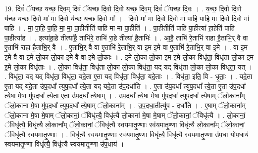 \documentclass[17pt]{extarticle}
\begin{document}
19. दिवं॑ ॅयच्छ यच्छ॒ दिव॒म् दिवं॑ ॅयच्छ दि॒वो दि॒वो य॑च्छ॒ दिव॒म् दिवं॑ ॅयच्छ दि॒वः । . य॒च्छ॒ दि॒वो दि॒वो य॑च्छ यच्छ दि॒वो मा॑ मा दि॒वो य॑च्छ यच्छ दि॒वो मा᳚ । . दि॒वो मा॑ मा दि॒वो दि॒वो मा॑ पाहि पाहि मा दि॒वो दि॒वो मा॑ पाहि । . मा॒ पा॒हि॒ पा॒हि॒ मा॒ मा॒ पा॒हीतीति॑ पाहि मा मा पा॒हीति॑ । . पा॒हीतीति॑ पाहि पा॒हीत्या॑ हा॒हेति॑ पाहि पा॒हीत्या॑ह । . इत्या॑हा॒हे तीत्या॑है॒ ताभि॑रे॒ ताभि॑ रा॒हे तीत्या॑ है॒ताभिः॑ । . आ॒है॒ ताभि॑ रे॒ताभि॑ राहा है॒ताभि॒र् वै वा ए॒ताभि॑ राहा है॒ताभि॒र् वै । . ए॒ताभि॒र् वै वा ए॒ताभि॑ रे॒ताभि॒र् वा इ॒म इ॒मे वा ए॒ताभि॑ रे॒ताभि॒र् वा इ॒मे । . वा इ॒म इ॒मे वै वा इ॒मे लो॒का लो॒का इ॒मे वै वा इ॒मे लो॒काः । . इ॒मे लो॒का लो॒का इ॒म इ॒मे लो॒का विधृ॑ता॒ विधृ॑ता लो॒का इ॒म इ॒मे लो॒का विधृ॑ताः । . लो॒का विधृ॑ता॒ विधृ॑ता लो॒का लो॒का विधृ॑ता॒ यद् यद् विधृ॑ता लो॒का लो॒का विधृ॑ता॒ यत् । . विधृ॑ता॒ यद् यद् विधृ॑ता॒ विधृ॑ता॒ यदे॒ता ए॒ता यद् विधृ॑ता॒ विधृ॑ता॒ यदे॒ताः । . विधृ॑ता॒ इति॒ वि - धृ॒ताः॒ । . यदे॒ता ए॒ता यद् यदे॒ता उ॑प॒दधा᳚ त्युप॒दधा᳚ त्ये॒ता यद् यदे॒ता उ॑प॒दधा॑ति । . ए॒ता उ॑प॒दधा᳚ त्युप॒दधा᳚ त्ये॒ता ए॒ता उ॑प॒दधा᳚ त्ये॒षा मे॒षा मु॑प॒दधा᳚ त्ये॒ता ए॒ता उ॑प॒दधा᳚ त्ये॒षाम् । . उ॒प॒दधा᳚ त्ये॒षा मे॒षा मु॑प॒दधा᳚ त्युप॒दधा᳚ त्ये॒षाम् ॅलो॒काना᳚म् ॅलो॒काना॑ मे॒षा मु॑प॒दधा᳚ त्युप॒दधा᳚ त्ये॒षाम् ॅलो॒काना᳚म् । . उ॒प॒दधा॒तीत्यु॑प - दधा॑ति । . ए॒षाम् ॅलो॒काना᳚म् ॅलो॒काना॑ मे॒षा मे॒षाम् ॅलो॒कानां॒ ॅविधृ॑त्यै॒ विधृ॑त्यै लो॒काना॑ मे॒षा मे॒षाम् ॅलो॒कानां॒ ॅविधृ॑त्यै । . लो॒कानां॒ ॅविधृ॑त्यै॒ विधृ॑त्यै लो॒काना᳚म् ॅलो॒कानां॒ ॅविधृ॑त्यै स्वयमातृ॒ण्णाः स्व॑यमातृ॒ण्णा विधृ॑त्यै लो॒काना᳚म् ॅलो॒कानां॒ ॅविधृ॑त्यै स्वयमातृ॒ण्णाः । . विधृ॑त्यै स्वयमातृ॒ण्णाः स्व॑यमातृ॒ण्णा विधृ॑त्यै॒ विधृ॑त्यै स्वयमातृ॒ण्णा उ॑प॒धा यो॑प॒धाय॑ स्वयमातृ॒ण्णा विधृ॑त्यै॒ विधृ॑त्यै स्वयमातृ॒ण्णा उ॑प॒धाय॑ । \newline
\end{document}
